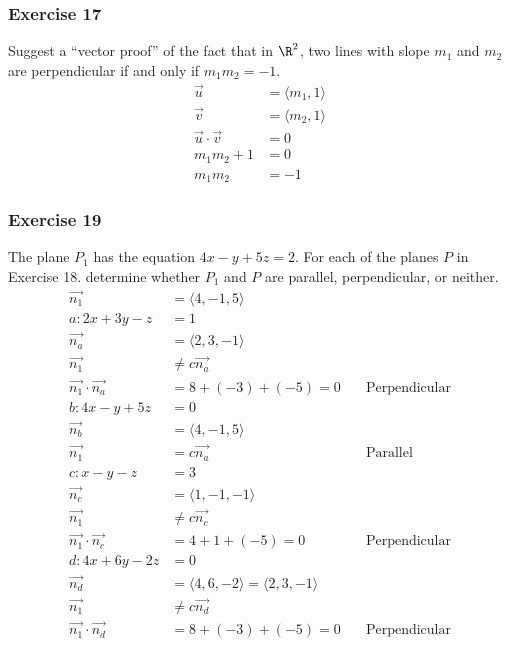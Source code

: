 \documentclass[letterpaper, 12pt]{math}
\begin{document}
\subsubsection*{Exercise 17}
Suggest a ``vector proof'' of the fact that in \( \R^2 \), two lines with slope
\( m_1 \) and \( m_2 \) are perpendicular if and only if \( m_1m_2 = -1 \).
\begin{align*}
  \vec{u} &= \langle m_1,1\rangle \\
  \vec{v} &= \langle m_2,1\rangle \\
  \vec{u}\cdot\vec{v} &= 0 \\
  m_1m_2+1 &= 0 \\
  m_1m_2 &= -1
\end{align*}

\subsubsection*{Exercise 19}
The plane \( P_1 \) has the equation \( 4x-y+5z = 2 \). For each
of the planes \( P \) in Exercise 18. determine whether \( P_1 \) and \( P \)
are parallel, perpendicular, or neither.
\begin{align*}
  \vec{n_1} &= \langle4,-1,5\rangle \\
  a: 2x+3y-z &= 1 \\
  \vec{n_a} &= \langle2,3,-1\rangle \\
  \vec{n_1} &\ne c\vec{n_a} \\
  \vec{n_1}\cdot\vec{n_a} &= 8+(-3)+(-5) = 0 \quad &\text{Perpendicular} \\
  b: 4x-y+5z &= 0 \\
  \vec{n_b} &= \langle4,-1,5\rangle \\
  \vec{n_1} &= c\vec{n_a} \quad &\text{Parallel} \\
  c: x-y-z &= 3 \\
  \vec{n_c} &= \langle1,-1,-1\rangle \\
  \vec{n_1} &\ne c\vec{n_c} \\
  \vec{n_1}\cdot\vec{n_c} &= 4+1+(-5) = 0 \quad &\text{Perpendicular} \\
  d: 4x+6y-2z &= 0 \\
  \vec{n_d} &= \langle4,6,-2\rangle = \langle2,3,-1\rangle \\
  \vec{n_1} &\ne c\vec{n_d} \\
  \vec{n_1}\cdot\vec{n_d} &= 8+(-3)+(-5) = 0 \quad &\text{Perpendicular}
\end{align*}
\end{document}
